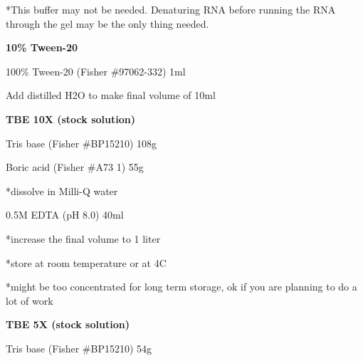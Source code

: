 \documentclass[11pt, oneside]{article}
\begin{document}
			\begin{adjustwidth}{7mm}{0pt}*This buffer may not be needed. Denaturing RNA before running the RNA through the gel may be the only 				thing needed. 
			\end{adjustwidth}
			
		\vspace{5mm}

		{\bf 10\% Tween-20}

			\hspace{2mm}100\% Tween-20 \hspace{2mm}(Fisher \#97062-332)\hspace{7mm}	1ml

			\hspace{2mm}Add distilled H2O to make final volume of 	10ml

		\vspace{5mm}


		{\bf TBE 10X (stock solution)}

			\hspace{2mm}Tris base 	\hspace{5mm}	(Fisher \#BP15210)	\hspace{5mm}	108g

			\hspace{2mm}Boric acid 	\hspace{3mm}	(Fisher \#A73 1)	\hspace{11mm}	55g

			\hspace{2mm}*dissolve in Milli-Q water

			\hspace{2mm}0.5M EDTA (pH 8.0)		\hspace{25mm}			40ml

			\hspace{2mm}*increase the final volume to 1 liter

			\hspace{2mm}*store at room temperature or at 4C

			\hspace{2mm}*might be too concentrated for long term storage, ok if you are planning to do a lot of work
	
		\vspace{5mm}

	\newpage

		{\bf TBE 5X (stock solution)}

			\hspace{2mm}Tris base 	\hspace{5mm}	(Fisher \#BP15210)	\hspace{5mm}	54g
\end{document}
